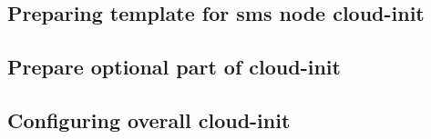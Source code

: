 \documentclass[letterpaper]{article}
\newcommand{\install}{yum -y install}
\newcommand{\groupinstall}{yum -y groupinstall}
\begin{document}
\subsection{Preparing template for sms node cloud-init} \label{sec:c_i-template-sms-node}

	

\subsection{Prepare optional part of cloud-init} \label{sec:c_i-optional}



\subsection{Configuring overall cloud-init} \label{sec:c_i-config}





\end{document}
